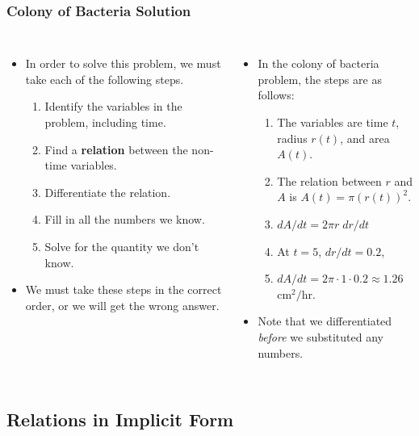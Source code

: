 \documentclass[serif,ignorenonframetext]{beamer}
\begin{document}
\begin{frame}
  \frametitle{Colony of Bacteria Solution}
  \begin{columns}
  \begin{itemize}[<+->]
  \item In order to solve this problem, we must take
    each of the following steps.
    \begin{enumerate}[<+->]
    \item Identify the variables in the problem, including time.
    \item Find a \textbf{relation} between the non-time variables.
    \item Differentiate the relation.
    \item Fill in all the numbers we know.
    \item Solve for the quantity we don't know.
    \end{enumerate}
  \item We must take these steps in the correct order, or we will get
    the wrong answer.
  \end{itemize}
  \begin{itemize}[<+->]
  \item In the colony of bacteria problem, the steps are as follows:
    \begin{enumerate}[<+->]
    \item The variables are time $t$, radius $r(t)$, and area $A(t)$.
    \item The relation between $r$ and $A$ is 
      $A(t)=\pi \left(r(t)\right)^2$.
    \item $dA/dt = 2\pi r \; dr/dt$
    \item At $t=5$, $dr/dt=0.2$, %
    \item $dA/dt = 2\pi \cdot 1 \cdot 0.2 \approx 1.26$ cm$^2/$hr.
    \end{enumerate}
  \item Note that we differentiated \textit{before} we substituted any numbers.
  \end{itemize}
  \end{columns}
\end{frame}


\subsection{Relations in Implicit Form}
\end{document}
